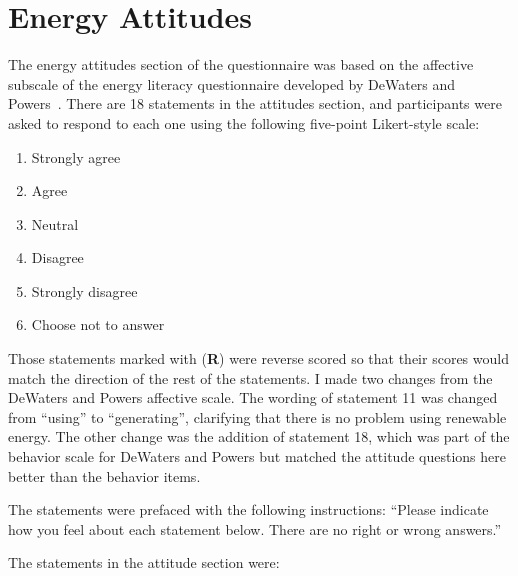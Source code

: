 \section{Energy Attitudes}
\label{sec:attitude-items}

The energy attitudes section of the questionnaire was based on the affective subscale of the energy literacy questionnaire developed by DeWaters and Powers~\cite{DeWaters2011}. There are 18 statements in the attitudes section, and participants were asked to respond to each one using the following five-point Likert-style scale:

\begin{enumerate}
	\item Strongly agree
	\item Agree
	\item Neutral
	\item Disagree
	\item Strongly disagree
	\item Choose not to answer
\end{enumerate}

Those statements marked with (\textbf{R}) were reverse scored so that their scores would match the direction of the rest of the statements. I made two changes from the DeWaters and Powers affective scale. The wording of statement 11 was changed from ``using'' to ``generating'', clarifying that there is no problem using renewable energy. The other change was the addition of statement 18, which was part of the behavior scale for DeWaters and Powers but matched the attitude questions here better than the behavior items.

The statements were prefaced with the following instructions: ``Please indicate how you feel about each statement below. There are no right or wrong answers.''

The statements in the attitude section were:

